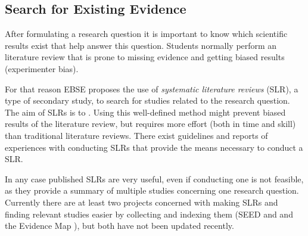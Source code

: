 
\subsection{Search for Existing Evidence}
\label{subsec:search for existing evidence} 

After formulating a research question it is important to know which scientific results exist that help answer this question. Students normally perform an  literature review that is prone to missing evidence and getting biased results (experimenter bias).

For that reason EBSE proposes the use of \emph{systematic literature reviews} (SLR), a type of secondary study, to search for studies related to the research question. The aim of SLRs is to  \cite{Zhang2011}. Using this well-defined method might prevent biased results of the literature review, but requires more effort (both in time and skill) than traditional literature reviews. There exist guidelines \cite{keele2007,Wohlin2014,Zhang2011} and reports of experiences with conducting SLRs \cite{Brereton2007} that provide the means necessary to conduct a SLR.

In any case published SLRs are very useful, even if conducting one is not feasible, as they provide a summary of multiple studies concerning one research question. Currently there are at least two projects concerned with making SLRs and finding relevant studies easier by collecting and indexing them (SEED \cite{Janzen2008} and and the Evidence Map \cite{EBSEWeb}), but both have not been updated recently. 

